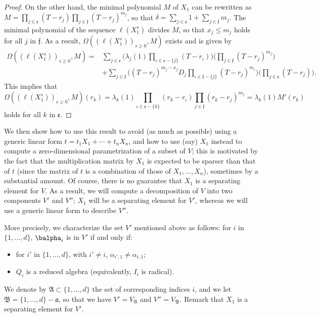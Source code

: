 \documentclass[12pt]{article}
\begin{document}
\begin{proof}
	On the other hand, the minimal polynomial $M$ of $X_1$ can be rewritten as $M=\prod_{j\in
		\mathfrak{e}}(T-r_j) \prod_{j \in \mathfrak{f}}(T-r_j)^{m_j}$, so
	that $\delta=\sum_{j \in \mathfrak{e}} 1 + \sum_{j\in \mathfrak{f}}
	m_j$. The minimal polynomial
	of the sequence $\ell(X_1^s)$ divides $M$, so that $x_j \le m_j$ holds for all $j$ in
	$\mathfrak{f}$.
	As a result, $\Omega((\ell(X_1^s))_{s\ge0},M)$ exists and is given by
	\begin{align*}
	\Omega((\ell(X_1^s))_{s\ge0},M)=&
	\sum_{j \in \mathfrak{e}}
	\Big(
	\lambda_j(1) \prod_{\iota \in \mathfrak{e}-\{j\}}(T-r_\iota)\Big)
	\Big(\prod_{j \in \mathfrak{f}}(T-r_j)^{m_j} \Big)\\
	&+
	\sum_{j\in \mathfrak{f}}
	\Big(  (T-r_j)^{m_j-x_j} D_j
	\prod_{\iota \in \mathfrak{f}-\{j\}}(T-r_j)^{m_\iota}\Big)
	\Big(\prod_{j\in \mathfrak{e}} (T-r_j) \Big).
	\end{align*}
	This implies that $$\Omega((\ell(X_1^s))_{s\ge0},M)(r_k) =\lambda_k(1) 
	\prod_{\iota \in \mathfrak{e}-\{k\}}(r_k-r_\iota)
	\prod_{j \in \mathfrak{f}}(r_k-r_j)^{m_j} = \lambda_k(1) M'(r_k)$$ 
	holds for all $k$ in $\mathfrak{e}$.
\end{proof}

We then show how to use this result to avoid (as much as possible)
using a generic linear form $t=t_1 X_1 + \cdots + t_n X_n$, and how to
use (say) $X_1$ instead to compute a zero-dimensional parametrization
of a subset of $V$; this is motivated by the fact that the
multiplication matrix by $X_1$ is expected to be sparser than that of
$t$ (since the matrix of $t$ is a combination of those of
$X_1,\dots,X_n$), sometimes by a substantial amount. Of course, there
is no guarantee that $X_1$ is a separating element for $V$. As a
result, we will compute a decomposition of $V$ into two components
$V'$ and $V''$; $X_1$ will be a separating element for $V'$, whereas
we will use a generic linear form to describe $V''$.

More precisely, we characterize the set $V'$ mentioned above as follows: for $i$ in
$\{1,\dots,d\}$, $\balpha_i$ is in $V'$ if and only if:
\begin{itemize}
	\item for $i'$ in $\{1,\dots,d\}$, with $i'\ne i$, $\alpha_{i',1} \ne
	\alpha_{i,1}$;
	\item $Q_i$ is a reduced algebra (equivalently, $I_i$ is radical).
\end{itemize}
We denote by $\mathfrak{A}\subset \{1,\dots,d\}$ the set of
corresponding indices $i$, and we let
$\mathfrak{B}=\{1,\dots,d\}-\mathfrak{a}$, so that we have
$V'=V_{\mathfrak{A}}$ and $V''=V_{\mathfrak{B}}$.  Remark that $X_1$
is a separating element for $V'$.
\end{document}
